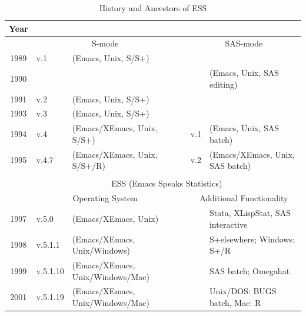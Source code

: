 \documentclass{article}
\newcommand*{\SAS}{\textsc{SAS}}
\newcommand*{\Splus}{\textsc{S-Plus}}
\begin{document}
\begin{table}[tbp]
  \centering
  \begin{tabular}{c ll c ll}
\hline
    Year  \\ 
\hline
         & \multicolumn{2}{c}{S-mode}       && \multicolumn{2}{c}{SAS-mode} \\ 
\cline{2-3} \cline{5-6}
    1989 & v.1 & (Emacs, Unix, S/S+)        &&  \\
    1990 &     &                            &&     & (Emacs, Unix, SAS editing) \\
    1991 & v.2 & (Emacs, Unix, S/S+)        && \\
    1993 & v.3 & (Emacs, Unix, S/S+)        && \\
    1994 & v.4 & (Emacs/XEmacs, Unix, S/S+) && v.1  & (Emacs, Unix, SAS batch) \\
    1995 & v.4.7 & (Emacs/XEmacs, Unix, S/S+/R) && v.2 & (Emacs/XEmacs, Unix, SAS batch) \\
    \cline{2-6}\\[-3.5ex]
    \cline{2-6}
         & \multicolumn{5}{c}{ESS (Emacs Speaks Statistics)} \\
    \cline{2-6} 
         &\multicolumn{2}{c}{Operating System} &&\multicolumn{2}{c}{Additional Functionality}\\
\cline{2-3} \cline{5-6}
    1997 & v.5.0 & (Emacs/XEmacs, Unix)         &&&  Stata, XLispStat, SAS interactive \\
    1998 & v.5.1.1 & (Emacs/XEmacs, Unix/Windows) &&&  S+elsewhere; Windows: S+/R\\
    1999 & v.5.1.10 & (Emacs/XEmacs, Unix/Windows/Mac) &&& SAS batch; Omegahat \\
    2001 & v.5.1.19 & (Emacs/XEmacs, Unix/Windows/Mac) &&& Unix/DOS: BUGS batch, Mac: R \\
\hline
  \end{tabular}
  \caption{History and Ancestors of ESS}
  \label{tab:timeline}
\end{table}


\end{document}

